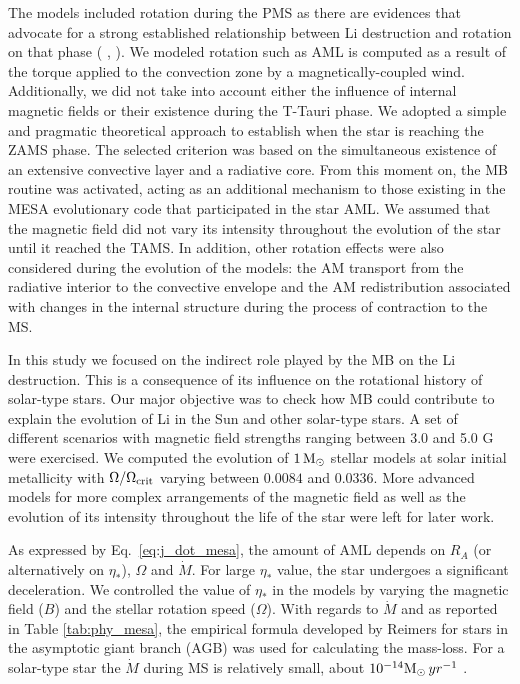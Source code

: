 \documentclass[fleqn,usenatbib]{mnras}
\begin{document}
The models included rotation during the PMS as there are evidences that advocate for a strong established relationship between Li destruction and rotation on that phase (\citeauthor{Bouvier2016} \citeyear{Bouvier2016}, \citeyear{Bouvier2018}). We modeled rotation such as AML is computed as a result of the torque applied to the convection zone by a magnetically-coupled wind. Additionally, we did not take into account either the influence of internal magnetic fields or their existence during the T-Tauri phase. We adopted a simple and pragmatic theoretical approach to establish when the star is reaching the ZAMS phase. The selected criterion was based on the simultaneous existence of an extensive convective layer and a radiative core. From this moment on, the MB routine was activated, acting as an additional mechanism to those existing in the MESA evolutionary code that participated in the star AML. We assumed that the magnetic field did not vary its intensity throughout the evolution of the star until it reached the TAMS. In addition, other rotation effects were also considered during the evolution of the models: the AM transport from the radiative interior to the convective envelope and the AM redistribution associated with changes in the internal structure during the process of contraction to the MS.\par

In this study we focused on the indirect role played by the MB on the Li destruction. This is a consequence of its influence on the rotational history of solar-type stars. Our major objective was to check how MB could contribute to explain the evolution of Li in the Sun and other solar-type stars. A set of different scenarios with magnetic field strengths ranging between 3.0 and 5.0 G were exercised. We computed the evolution of $1\,\mathrm{M}_\odot$ stellar models at solar initial metallicity with $\Omega / \Omega_{\mathrm{crit}}$ varying between $0.0084$ and $0.0336$. More advanced models for more complex arrangements of the magnetic field as well as the evolution of its intensity throughout the life of the star were left for later work.\par


As expressed by Eq.~\ref{eq:j_dot_mesa}, the amount of AML depends on $R_A$ (or alternatively on $\eta_*$), $\Omega$ and $\Dot{M}$. For large $\eta_*$ value, the star undergoes a significant deceleration. We controlled the value of $\eta_*$ in the models by varying the magnetic field ($B$) and the stellar rotation speed ($\Omega$). With regards to $\Dot{M}$ and as reported in Table \ref{tab:phy_mesa}, the empirical formula developed by Reimers \citep{Reimers1975} for stars in the asymptotic giant branch (AGB) was used for calculating the mass-loss. For a solar-type star the $\Dot{M}$ during MS is relatively small, about  $10^{-14}\mathrm{M}_\odot \, yr^{-1}$ \citep{Noerdlinger2008}. \par
\end{document}
